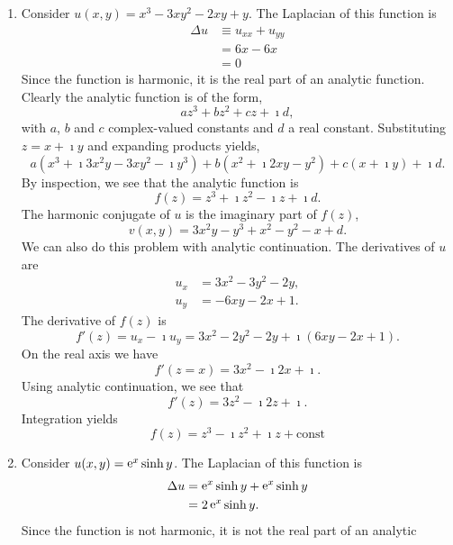 {%
\begin{Solution}
  \begin{enumerate}
  \item
    Consider $u(x,y) = x^3 - 3 x y^2 - 2 x y + y$.  The Laplacian of this
    function is
    \begin{align*}
      \Delta u &\equiv u_{x x} + u_{y y} 
      \\
      &= 6 x - 6 x 
      \\
      &= 0
    \end{align*}
    Since the function is harmonic, it is the real part of an analytic 
    function.  Clearly the analytic function is of the form,
    \[
    a z^3 + b z^2 + c z + \imath d,
    \]
    with $a$, $b$ and $c$ complex-valued constants and $d$ a real constant.
    Substituting $z = x + \imath y$
    and expanding products yields,
    \[
    a \left( x^3 + \imath 3 x^2 y - 3 x y^2 - \imath y^3 \right)
    + b \left( x^2 + \imath 2 x y - y^2 \right)
    + c (x + \imath y) + \imath d.
    \]
    By inspection, we see that the analytic function is
    \[
    \boxed{
      f(z) = z^3 + \imath z^2 - \imath z + \imath d.
      }
    \]
    The harmonic conjugate of $u$ is the imaginary part of $f(z)$,
    \[
    \boxed{
      v(x,y) = 3 x^2 y - y^3 + x^2 - y^2 - x + d.
      }
    \]
    We can also do this problem with analytic continuation.  The derivatives
    of $u$ are
    \begin{align*}
      u_x &= 3 x^2 - 3 y^2 - 2 y, 
      \\
      u_y &= -6 x y - 2 x + 1.
    \end{align*}
    The derivative of $f(z)$ is 
    \[
    f'(z) = u_x - \imath u_y = 3 x^2 - 2 y^2 - 2 y + \imath (6 x y - 2 x + 1).
    \]
    On the real axis we have
    \[
    f'(z = x) = 3 x^2 - \imath 2 x + \imath.
    \]
    Using analytic continuation, we see that
    \[
    f'(z) = 3 z^2 - \imath 2 z + \imath.
    \]
    Integration yields
    \[
    f(z) = z^3 - \imath z^2 + \imath z + \mathrm{const}
    \]
  \item
    Consider $u(x,y) = \mathop{\mathrm{e}}\nolimits^x \sinh y$.  The Laplacian of this function is
    \begin{align*}
      \Delta u &= \mathop{\mathrm{e}}\nolimits^x \sinh y + \mathop{\mathrm{e}}\nolimits^x \sinh y 
      \\
      &= 2 \mathop{\mathrm{e}}\nolimits^x \sinh y.
    \end{align*}
    Since the function is not harmonic, it is not the real part of an analytic

\end{enumerate}
\end{Solution}}

